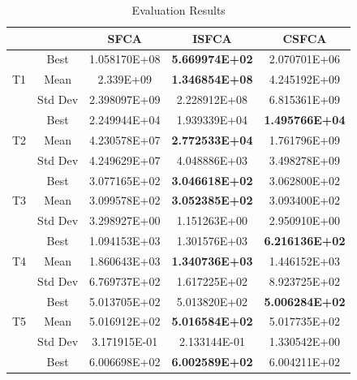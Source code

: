 \documentclass[letterpaper]{article}
\begin{document}
\begin{center}
\begin{table}[htbp]
	\caption{Evaluation Results}
	\begin{center}
		\centering
		\resizebox{\columnwidth}{!}
		{\begin{tabular}{|c|c|c|c|c|}
				\hline
				\multicolumn{1}{|l|}{} & \multicolumn{1}{l|}{} & SFCA & ISFCA & CSFCA \\ \hline
				\multicolumn{ 1}{|c|}{} & Best & 1.058170E+08 & \textbf{5.669974E+02} & 2.070701E+06 \\ \cline{ 2- 5}
				\multicolumn{ 1}{|c|}{T1} & Mean & 2.339E+09 & \textbf{1.346854E+08} & 4.245192E+09 \\ \cline{ 2- 5}
				\multicolumn{ 1}{|c|}{} & Std Dev & 2.398097E+09 & 2.228912E+08 & 6.815361E+09 \\ \hline
				\multicolumn{ 1}{|c|}{} & Best & 2.249944E+04 & 1.939339E+04 & \textbf{1.495766E+04} \\ \cline{ 2- 5}
				\multicolumn{ 1}{|c|}{T2} & Mean & 4.230578E+07 & \textbf{2.772533E+04} & 1.761796E+09 \\ \cline{ 2- 5}
				\multicolumn{ 1}{|c|}{} & Std Dev & 4.249629E+07 & 4.048886E+03 & 3.498278E+09 \\ \hline
				\multicolumn{ 1}{|c|}{} & Best & 3.077165E+02 & \textbf{3.046618E+02} & 3.062800E+02 \\ \cline{ 2- 5}
				\multicolumn{ 1}{|c|}{T3} & Mean & 3.099578E+02 & \textbf{3.052385E+02} & 3.093400E+02 \\ \cline{ 2- 5}
				\multicolumn{ 1}{|c|}{} & Std Dev & 3.298927E+00 & 1.151263E+00 & 2.950910E+00 \\ \hline
				\multicolumn{ 1}{|c|}{} & Best & 1.094153E+03 & 1.301576E+03 & \textbf{6.216136E+02} \\ \cline{ 2- 5}
				\multicolumn{ 1}{|c|}{T4} & Mean & 1.860643E+03 & \textbf{1.340736E+03} & 1.446152E+03 \\ \cline{ 2- 5}
				\multicolumn{ 1}{|c|}{} & Std Dev & 6.769737E+02 & 1.617225E+02 & 8.923725E+02 \\ \hline
				\multicolumn{ 1}{|c|}{} & Best & 5.013705E+02 & 5.013820E+02 & \textbf{5.006284E+02} \\ \cline{ 2- 5}
				\multicolumn{ 1}{|c|}{T5} & Mean & 5.016912E+02 & \textbf{5.016584E+02} & 5.017735E+02 \\ \cline{ 2- 5}
				\multicolumn{ 1}{|c|}{} & Std Dev & 3.171915E-01 & 2.133144E-01 & 1.330542E+00 \\ \hline
				\multicolumn{ 1}{|c|}{} & Best & 6.006698E+02 & \textbf{6.002589E+02} & 6.004211E+02 \\ \cline{ 2- 5}

\end{tabular}}
\end{center}
\end{table}
\end{center}
\end{document}
